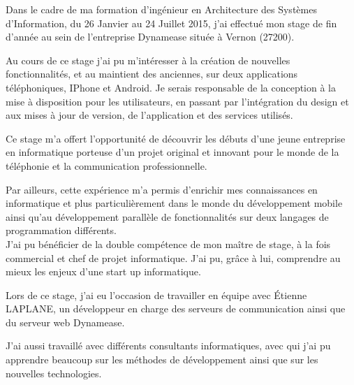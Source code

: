 Dans le cadre de ma formation d’ingénieur en Architecture des Systèmes d'Information, du 26 Janvier au 24 Juillet 2015, j’ai effectué mon stage de fin d'année au sein de l'entreprise Dynamease située à Vernon (27200).

Au cours de ce stage j’ai pu m’intéresser à la création de nouvelles fonctionnalités, et au maintient des anciennes, sur deux applications téléphoniques, IPhone et Android. Je serais responsable de la conception à la mise à disposition pour les utilisateurs, en passant par l’intégration du design et aux mises à jour de version, de l’application et des services utilisés.

Ce stage m’a offert l’opportunité de découvrir les débuts d’une jeune entreprise en informatique porteuse d’un projet original et innovant pour le monde de la téléphonie et la communication professionnelle.

Par ailleurs, cette expérience m’a permis d’enrichir mes connaissances en informatique et plus particulièrement dans le monde du développement mobile ainsi qu'au développement parallèle de fonctionnalités sur deux langages de programmation différents.\\


J’ai pu bénéficier de la double compétence de mon maître de stage, à la fois commercial et chef de projet informatique. J’ai pu, grâce à lui, comprendre au mieux les enjeux d’une start up informatique.


Lors de ce stage, j’ai eu l’occasion de travailler en équipe avec Étienne LAPLANE, un développeur en charge des serveurs de communication ainsi que du serveur web Dynamease.

J’ai aussi travaillé avec différents consultants informatiques, avec qui j'ai pu apprendre beaucoup sur les méthodes de développement ainsi que sur les nouvelles technologies.